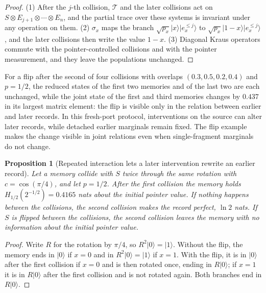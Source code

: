 \documentclass[12pt,a4paper]{article}
\newtheorem{proposition}[theorem]{Proposition}
\begin{document}
\begin{proof}
(1) After the $j$-th collision, $\mathcal T$ and the later collisions act on $S\otimes E_{j+1}\otimes\cdots\otimes E_n$, and the partial trace over these systems is invariant under any operation on them. (2) $\sigma_x$ maps the branch $\sqrt{p_x}|x\rangle|e_x^{\le j}\rangle$ to $\sqrt{p_x}|1-x\rangle|e_x^{\le j}\rangle$, and the later collisions then write the value $1-x$. (3) Diagonal Kraus operators commute with the pointer-controlled collisions and with the pointer measurement, and they leave the populations unchanged.
\end{proof}

For a flip after the second of four collisions with overlaps $(0.3,0.5,0.2,0.4)$ and $p=1/2$, the reduced states of the first two memories and of the last two are each unchanged, while the joint state of the first and third memories changes by $0.437$ in its largest matrix element: the flip is visible only in the relation between earlier and later records. In this fresh-port protocol, interventions on the source can alter later records, while detached earlier marginals remain fixed. The flip example makes the change visible in joint relations even when single-fragment marginals do not change.

\begin{proposition}[Repeated interaction lets a later intervention rewrite an earlier record]
\label{prop:recollision}
Let a memory collide with $S$ twice through the same rotation with $c=\cos(\pi/4)$, and let $p=1/2$. After the first collision the memory holds $H_{1/2}(2^{-1/2})=0.4165$ nats about the initial pointer value. If nothing happens between the collisions, the second collision makes the record perfect, $\ln2$ nats. If $S$ is flipped between the collisions, the second collision leaves the memory with no information about the initial pointer value.
\end{proposition}

\begin{proof}
Write $R$ for the rotation by $\pi/4$, so $R^2|0\rangle=|1\rangle$. Without the flip, the memory ends in $|0\rangle$ if $x=0$ and in $R^2|0\rangle=|1\rangle$ if $x=1$. With the flip, it is in $|0\rangle$ after the first collision if $x=0$ and is then rotated once, ending in $R|0\rangle$; if $x=1$ it is in $R|0\rangle$ after the first collision and is not rotated again. Both branches end in $R|0\rangle$.
\end{proof}
\end{document}
